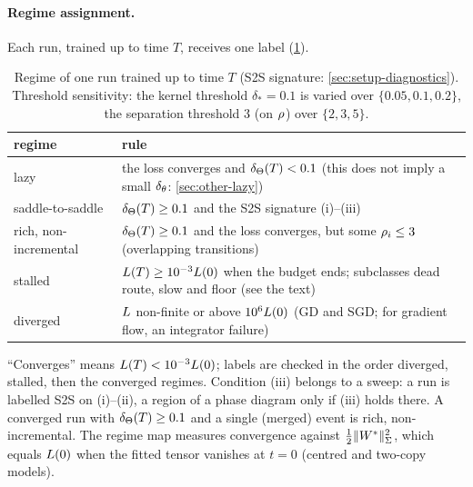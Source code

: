 \paragraph{Regime assignment.}
Each run, trained up to time $T$, receives one label (\cref{tab:regimes}).

\begin{table}[t]
  \centering
  \caption{Regime of one run trained up to time $T$ (S2S signature: \cref{sec:setup-diagnostics}).
    Threshold sensitivity: the kernel threshold $\delta_*=0.1$ is varied over $\{0.05,0.1,0.2\}$, the
    separation threshold $3$ (on $\rho_{}$) over $\{2,3,5\}$.}
  \label{tab:regimes}
  \begin{tabularx}{\textwidth}{@{}lX@{}}
    \toprule
    regime & rule \\
    \midrule
    lazy & the loss converges and $\delta_{\Theta}(T)<0.1$ (this does not imply a small $\delta_{\theta}$:
      \cref{sec:other-lazy}) \\
    saddle-to-saddle & $\delta_{\Theta}(T)\ge0.1$ and the S2S signature (i)--(iii) \\
    rich, non-incremental & $\delta_{\Theta}(T)\ge0.1$ and the loss converges, but some $\rho_{i}\le3$
      (overlapping transitions) \\
    stalled & $L(T)\ge10^{-3}L(0)$ when the budget ends; subclasses dead route, slow and
      floor (see the text) \\
    diverged & $L$ non-finite or above $10^{6}L(0)$ (GD and SGD; for gradient flow, an
      integrator failure) \\
    \bottomrule
  \end{tabularx}
\end{table}

\begin{remark}\label{rem:regime-rules}
  ``Converges'' means $L(T)<10^{-3}L(0)$; labels are checked in the order diverged,
  stalled, then the converged regimes. Condition (iii) belongs to a sweep: a run is labelled S2S on
  (i)--(ii), a region of a phase diagram only if (iii) holds there. A converged run with
  $\delta_{\Theta}(T)\ge0.1$ and a single (merged) event is rich, non-incremental. The regime map measures
  convergence against $\frac12\lVert W^{*}\rVert_{\Sigma}^2$, which equals $L(0)$ when the fitted tensor vanishes
  at $t=0$ (centred and two-copy models).
\end{remark}

